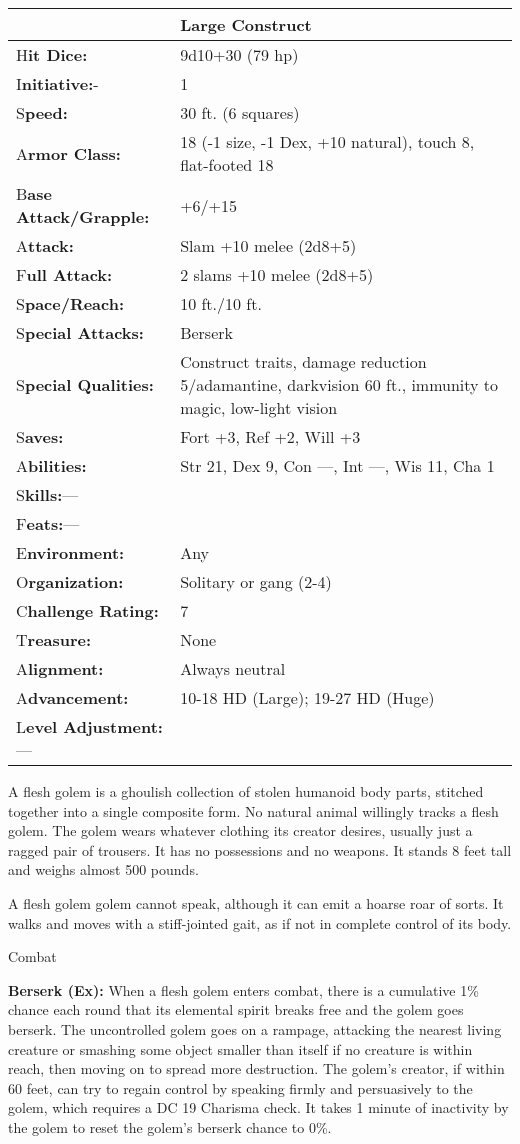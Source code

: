\documentclass{article}
\begin{document}
\begin{tabular}{|>{\raggedright}p{91pt}|>{\raggedright}p{232pt}|}
\hline
  & Large Construct\tabularnewline
\hline
H\textbf{it Dice:} & 9d10+30 (79 hp)\tabularnewline
\hline
I\textbf{nitiative:}- & 1\tabularnewline
\hline
S\textbf{peed:} & 30 ft. (6 squares)\tabularnewline
\hline
A\textbf{rmor Class:} & 18 (-1 size, -1 Dex, +10 natural), touch 8, flat-footed 
18\tabularnewline
\hline
B\textbf{ase Attack/Grapple:} & +6/+15\tabularnewline
\hline
A\textbf{ttack:} & Slam +10 melee (2d8+5)\tabularnewline
\hline
F\textbf{ull Attack:} & 2 slams +10 melee (2d8+5)\tabularnewline
\hline
S\textbf{pace/Reach:} & 10 ft./10 ft.\tabularnewline
\hline
S\textbf{pecial Attacks:} & Berserk\tabularnewline
\hline
S\textbf{pecial Qualities:} & Construct traits, damage reduction 5/adamantine, 
darkvision 60 ft., immunity to magic, low-light vision\tabularnewline
\hline
S\textbf{aves:} & Fort +3, Ref +2, Will +3\tabularnewline
\hline
A\textbf{bilities:} & Str 21, Dex 9, Con ---, Int ---, Wis 11, Cha 1\tabularnewline
\hline
S\textbf{kills:}--- & \tabularnewline
\hline
F\textbf{eats:}--- & \tabularnewline
\hline
E\textbf{nvironment:} & Any\tabularnewline
\hline
O\textbf{rganization:} & Solitary or gang (2-4)\tabularnewline
\hline
C\textbf{hallenge Rating:} & 7\tabularnewline
\hline
T\textbf{reasure:} & None\tabularnewline
\hline
A\textbf{lignment:} & Always neutral\tabularnewline
\hline
A\textbf{dvancement:} & 10-18 HD (Large); 19-27 HD (Huge)\tabularnewline
\hline
L\textbf{evel Adjustment:}--- & \tabularnewline
\hline
\end{tabular}

A flesh golem is a ghoulish collection of stolen humanoid body parts, stitched 
together into a single composite form. No natural animal willingly tracks a flesh 
golem. The golem wears whatever clothing its creator desires, usually just a ragged 
pair of trousers. It has no possessions and no weapons. It stands 8 feet tall and 
weighs almost 500 pounds.

A flesh golem golem cannot speak, although it can emit a hoarse roar of sorts. 
It walks and moves with a stiff-jointed gait, as if not in complete control of 
its body.

Combat

\textbf{Berserk (Ex):} When a flesh golem enters combat, there is a cumulative 
1\% chance each round that its elemental spirit breaks free and the golem goes 
berserk. The uncontrolled golem goes on a rampage, attacking the nearest living 
creature or smashing some object smaller than itself if no creature is within reach, 
then moving on to spread more destruction. The golem's creator, if within 60 feet, 
can try to regain control by speaking firmly and persuasively to the golem, which 
requires a DC 19 Charisma check. It takes 1 minute of inactivity by the golem to 
reset the golem's berserk chance to 0\%.
\end{document}
